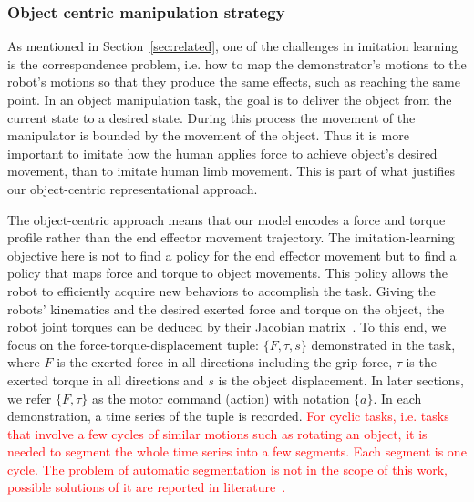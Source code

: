 \subsubsection{Object centric manipulation strategy}
\label{sec:objectlevel}
As mentioned in Section~\ref{sec:related}, one of the challenges in
imitation learning is the correspondence problem, i.e. how to map the
demonstrator's motions to the robot's motions so that they produce the
same effects, such as reaching the same
point. %
In an object manipulation task, the goal is to deliver the object from
the current state to a desired state. During this process the movement
of the manipulator is bounded by the movement of the object. Thus it is
more important to imitate how the human applies force to achieve object's
desired movement, than to imitate human limb movement.  This is part
of what justifies our object-centric representational approach.

The object-centric approach means that our model encodes a force and
torque profile rather than the end effector movement trajectory.  The
imitation-learning objective here is not to find a policy for the end
effector movement but to find a policy that maps force and torque
to object movements. This policy allows the robot to efficiently
acquire new behaviors to accomplish the
task. %
Giving the robots' kinematics and the desired exerted force and torque
on the object, the robot joint torques can be deduced by their Jacobian
matrix~\citep{okamura2000overview}. To this end, we focus on the
force-torque-displacement tuple: $\{F,\tau,s\}$ demonstrated in the
task, where $F$ is the exerted force in all directions including the
grip force, $\tau$ is the exerted torque in all directions and $s$ is
the object displacement. In later sections, we refer $\{F,\tau\}$ as
the motor command (action) with notation $\{a\}$. In each
demonstration, a time series of the tuple is recorded. \textcolor{red}{For cyclic tasks, i.e. tasks that involve a few cycles of similar motions such as rotating an object, it is needed to segment the whole time series into a few segments. Each segment is one cycle. The problem of automatic segmentation is not in the scope of this work, possible solutions of it are reported in literature~\citep{demiris2006hierarchical,kulic2009online,pais2013learning}.}



